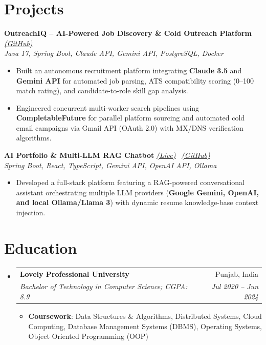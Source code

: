 \documentclass[a4paper,10pt]{article}
\makeatletter
\newcommand{\resumeSubheading}[4]{
  \vspace{-2pt}\item
    \begin{tabular*}{0.97\textwidth}{l@{\extracolsep{\fill}}r}
      \textbf{#1} & #2 \\
      \textit{#3} & \textit{#4} \\
    \end{tabular*}\vspace{-4pt}
}
\newcommand{\resumeSubHeadingListStart}{\begin{itemize}[leftmargin=*]}
\newcommand{\resumeSubHeadingListEnd}{\end{itemize}}
\newcommand{\resumeItemListStart}{\begin{itemize}}
\newcommand{\resumeItemListEnd}{\end{itemize}\vspace{-4pt}}
\makeatother
\begin{document}
\vspace{1pt}
\section{Projects}

\vspace{1pt}
\textbf{OutreachIQ – AI-Powered Job Discovery \& Cold Outreach Platform} \href{https://github.com/parthnautiyal/email-automator-springboot}{\textit{(GitHub)}} \\
\textit{Java 17, Spring Boot, Claude API, Gemini API, PostgreSQL, Docker}
\begin{itemize}[label={\textbullet}, itemsep=0.02em, leftmargin=*]
\item Built an autonomous recruitment platform integrating \textbf{Claude 3.5} and \textbf{Gemini API} for automated job parsing, ATS compatibility scoring (0--100 match rating), and candidate-to-role skill gap analysis.
\item Engineered concurrent multi-worker search pipelines using \textbf{CompletableFuture} for parallel platform sourcing and automated cold email campaigns via Gmail API (OAuth 2.0) with MX/DNS verification algorithms.
\end{itemize}

\vspace{2pt}
\textbf{AI Portfolio \& Multi-LLM RAG Chatbot} \href{https://parthnautiyal.vercel.app/}{\textit{(Live)}} \textbar\ \href{https://github.com/parthnautiyal/portfolio}{\textit{(GitHub)}} \\
\textit{Spring Boot, React, TypeScript, Gemini API, OpenAI API, Ollama}
\begin{itemize}[label={\textbullet}, itemsep=0.02em, leftmargin=*]
\item Developed a full-stack platform featuring a RAG-powered conversational assistant orchestrating multiple LLM providers (\textbf{Google Gemini, OpenAI, and local Ollama/Llama 3}) with dynamic resume knowledge-base context injection.
\end{itemize}

\vspace{1pt}
\section{Education}
  \resumeSubHeadingListStart
    \resumeSubheading
      {Lovely Professional University}{Punjab, India}
      {Bachelor of Technology in Computer Science; CGPA: 8.9}{Jul 2020 – Jun 2024}
    \resumeItemListStart
      \item \textbf{Coursework}: Data Structures \& Algorithms, Distributed Systems, Cloud Computing, Database Management Systems (DBMS), Operating Systems, Object Oriented Programming (OOP)
    \resumeItemListEnd
  \resumeSubHeadingListEnd
\end{document}
